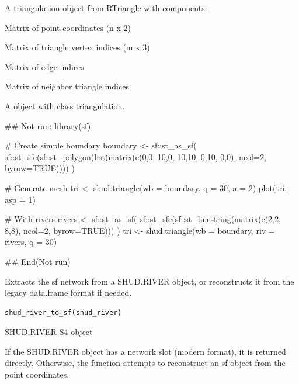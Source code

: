 \documentclass[a4paper]{book}
\begin{document}
%
\begin{Value}
A triangulation object from RTriangle with components:
\begin{ldescription}
\item[\code{P}] Matrix of point coordinates (n x 2)
\item[\code{T}] Matrix of triangle vertex indices (m x 3)
\item[\code{E}] Matrix of edge indices
\item[\code{NB}] Matrix of neighbor triangle indices

\end{ldescription}
A object with class triangulation.
\end{Value}
%
\begin{Examples}
\begin{ExampleCode}
## Not run: 
library(sf)

# Create simple boundary
boundary <- sf::st_as_sf(
  sf::st_sfc(sf::st_polygon(list(matrix(c(0,0, 10,0, 10,10, 0,10, 0,0),
                                         ncol=2, byrow=TRUE))))
)

# Generate mesh
tri <- shud.triangle(wb = boundary, q = 30, a = 2)
plot(tri, asp = 1)

# With rivers
rivers <- sf::st_as_sf(
  sf::st_sfc(sf::st_linestring(matrix(c(2,2, 8,8), ncol=2, byrow=TRUE)))
)
tri <- shud.triangle(wb = boundary, riv = rivers, q = 30)

## End(Not run)
\end{ExampleCode}
\end{Examples}
%
\begin{Description}\relax
Extracts the sf network from a SHUD.RIVER object, or reconstructs it
from the legacy data.frame format if needed.
\end{Description}
%
\begin{Usage}
\begin{verbatim}
shud_river_to_sf(shud_river)
\end{verbatim}
\end{Usage}
%
\begin{Arguments}
\begin{ldescription}
\item[\code{shud\_river}] SHUD.RIVER S4 object
\end{ldescription}
\end{Arguments}
%
\begin{Details}\relax
If the SHUD.RIVER object has a network slot (modern format), it is
returned directly. Otherwise, the function attempts to reconstruct
an sf object from the point coordinates.
\end{Details}
\end{document}
